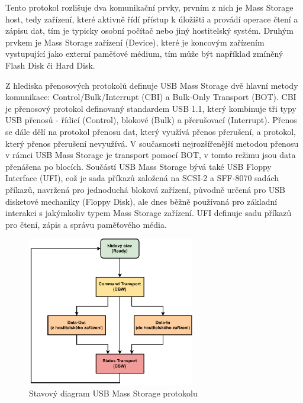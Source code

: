 Tento protokol rozlišuje dva komunikační prvky, prvním z nich je Mass Storage host, tedy zařízení, které aktivně řídí přístup k úložišti a provádí operace čtení a zápisu dat, tím je typicky osobní počítač nebo jiný hostitelský systém. Druhým prvkem je Mass Storage zařízení (Device), které je koncovým zařízením vystupující jako externí paměťové médium, tím může být například zmíněný Flash Disk či Hard Disk.

Z hlediska přenosových protokolů definuje USB Mass Storage dvě hlavní metody komunikace: Control/Bulk/Interrupt (CBI) a Bulk-Only Transport (BOT). CBI je přenosový protokol definovaný standardem USB 1.1, který kombinuje tři typy USB přenosů - řídicí (Control), blokové (Bulk) a přerušovací (Interrupt). Přenos se dále dělí na protokol přenosu dat, který využívá přenos přerušení, a protokol, který přenos přerušení nevyužívá. V současnosti nejrozšířenější metodou přenosu v rámci USB Mass Storage je transport pomocí BOT, v tomto režimu jsou data přenášena po blocích.
Součástí USB Mass Storage bývá také USB Floppy Interface (UFI), což je sada příkazů založená na SCSI-2 a SFF-8070 sadách příkazů, navržená pro jednoduchá bloková zařízení, původně určená pro USB disketové mechaniky (Floppy Disk), ale dnes běžně používaná pro základní interakci s jakýmkoliv typem Mass Storage zařízení. UFI definuje sadu příkazů pro čtení, zápis a správu paměťového média. \cite{usb_standard_ufi}

\begin{figure}[h]
    \centering
    \includegraphics[width=0.65\textwidth]{obrazky-figures/mass_storage_protocol-cz.pdf}
    
    \caption{Stavový diagram USB Mass Storage protokolu \cite{silicon_labs_mass_storage_protocol}}
    \label{fig:mass-storage-protocol}
\end{figure}

